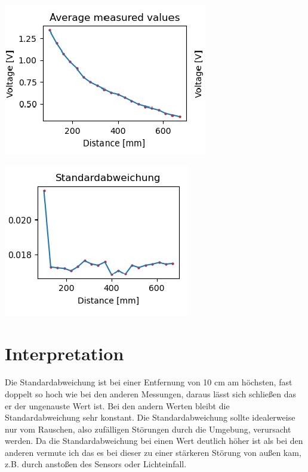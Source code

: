 	\includegraphics[scale=1]{media/avrg.png}

	\includegraphics[scale=1]{media/stdabw.png}

	
\section{Interpretation}

Die Standardabweichung ist bei einer Entfernung von 10 cm am höchsten, fast doppelt so hoch wie bei den anderen Messungen, daraus lässt sich schließen das er der ungenauste Wert ist.
Bei den andern Werten bleibt die Standardabweichung sehr konstant.
Die Standardabweichung sollte idealerweise nur vom Rauschen, also zufälligen Störungen durch die Umgebung, verursacht werden. Da die Standardabweichung bei einen Wert deutlich höher ist als bei den anderen vermute ich das es bei dieser zu einer stärkeren Störung von außen kam, z.B. durch anstoßen des Sensors oder Lichteinfall.
	
\label{chap:VERSUCH_1_INTERPRETATION}
